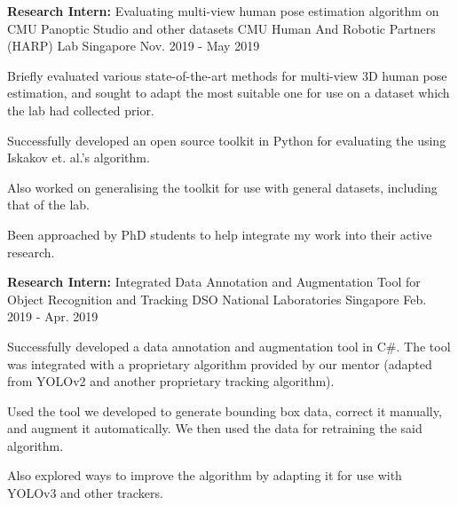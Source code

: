 \begin{cventries}

\label{computerVisionProjectCMU}

\cventry
{
	\textbf{Research Intern:}  Evaluating multi-view human pose estimation algorithm on CMU Panoptic Studio and other datasets  
} %
{CMU Human And Robotic Partners (HARP) Lab} %
{Singapore} %
{Nov. 2019 - May 2019} %
{ %
	\begin{cvitems}
		\item { Briefly evaluated various state-of-the-art methods for multi-view 3D human pose estimation, and sought to adapt the most suitable one for use on a dataset which the lab had collected prior.}
		\item { Successfully developed an open source toolkit in Python for evaluating the  using Iskakov et. al.'s   algorithm.}
		\item { Also worked on generalising the toolkit for use with general datasets, including that of the lab.}
        \item { Been approached by PhD students to help integrate my work into their active research. }
	\end{cvitems}
}


\label{computerVisionProjectDSO}

\cventry
{
	\textbf{Research Intern:} Integrated Data Annotation and Augmentation Tool for Object Recognition and Tracking
} %
{DSO National Laboratories} %
{Singapore} %
{Feb. 2019 - Apr. 2019} %
{ %
	\begin{cvitems}
		\item { Successfully developed a data annotation and augmentation tool in C\#. The tool was integrated with a proprietary algorithm provided by our mentor (adapted from YOLOv2 and another proprietary tracking algorithm).}
		\item { Used the tool we developed to generate bounding box data, correct it manually, and augment it automatically. We then used the data for retraining the said algorithm.}
		\item { Also explored ways to improve the algorithm by adapting it for use with YOLOv3 and other trackers.}
	\end{cvitems}
}


\end{cventries}
